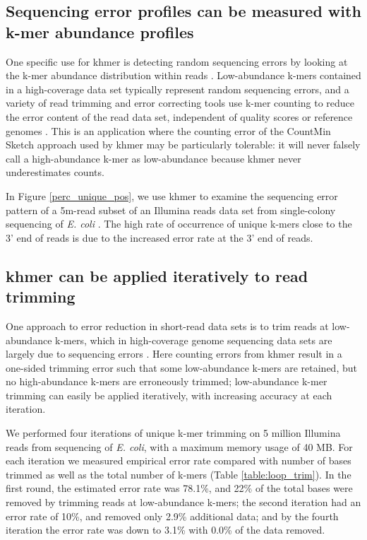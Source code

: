 \documentclass{article}
\begin{document}
\subsection{Sequencing error profiles can be measured with k-mer abundance
profiles}

One specific use for khmer is detecting random sequencing errors by
looking at the k-mer abundance distribution within reads \cite{Medvedev2011}.
Low-abundance k-mers contained in a high-coverage data set typically
represent random sequencing errors, and a variety of read trimming and
error correcting tools use k-mer counting to reduce the error content
of the read data set, independent of quality scores or reference
genomes \cite{Kelley2010}.  This is an application where the counting
error of the CountMin Sketch approach used by khmer may be
particularly tolerable: it will never falsely call a high-abundance k-mer as low-abundance because khmer never underestimates counts.


In Figure \ref{perc_unique_pos}, we use khmer to examine the
sequencing error pattern of a 5m-read subset of an Illumina reads
data set from single-colony sequencing of {\em E. coli}
\cite{pubmed21926975}.  The high rate of occurrence of unique k-mers
close to the 3' end of reads is due to the increased error rate at the
3' end of reads.

\subsection{khmer can be applied iteratively to read trimming}

One approach to error reduction in short-read data sets is to trim
reads at low-abundance k-mers, which in high-coverage genome
sequencing data sets are largely due to sequencing errors \cite{Kelley2010}.
Here counting errors from khmer result in a one-sided trimming
error such that some low-abundance k-mers are retained, but no
high-abundance k-mers are erroneously trimmed; low-abundance k-mer
trimming can easily be applied iteratively, with increasing accuracy
at each iteration.

We performed four iterations of unique k-mer trimming on 5 million
Illumina reads from sequencing of {\em E. coli}, with a maximum memory
usage of 40 MB.  For each iteration we measured empirical error rate
compared with number of bases trimmed as well as the total number of
k-mers
(Table \ref{table:loop_trim}).
In the first round, the estimated error
rate was 78.1\%, and 22\% of the total bases were removed by trimming
reads at low-abundance k-mers; the second iteration had an error
rate of 10\%, and removed only 2.9\% additional data; and by
the fourth iteration the error rate was down to 3.1\% with 0.0\% of the data removed.
\end{document}
